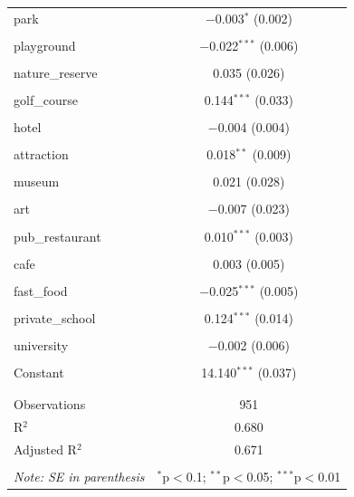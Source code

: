 \documentclass{article}
\begin{document}
\begin{table}[H]
\begin{tabular}{@{\extracolsep{-10pt}}lc}
 park & $-$0.003$^{*}$ (0.002) \\ 
  & \\ 
 playground & $-$0.022$^{***}$ (0.006) \\ 
  & \\ 
 nature\_reserve & 0.035 (0.026) \\ 
  & \\ 
 golf\_course & 0.144$^{***}$ (0.033) \\ 
  & \\ 
 hotel & $-$0.004 (0.004) \\ 
  & \\ 
 attraction & 0.018$^{**}$ (0.009) \\ 
  & \\ 
 museum & 0.021 (0.028) \\ 
  & \\ 
 art & $-$0.007 (0.023) \\ 
  & \\ 
 pub\_restaurant & 0.010$^{***}$ (0.003) \\ 
  & \\ 
 cafe & 0.003 (0.005) \\ 
  & \\ 
 fast\_food & $-$0.025$^{***}$ (0.005) \\ 
  & \\ 
 private\_school & 0.124$^{***}$ (0.014) \\ 
  & \\ 
 university & $-$0.002 (0.006) \\ 
  & \\ 
 Constant & 14.140$^{***}$ (0.037) \\ 
  & \\ 
\hline \\[-1.8ex] 
Observations & 951 \\ 
R$^{2}$ & 0.680 \\ 
Adjusted R$^{2}$ & 0.671 \\ 
\hline 
\hline \\[-1.8ex] 
\textit{Note: SE in parenthesis}  & \multicolumn{1}{r}{$^{*}$p$<$0.1; $^{**}$p$<$0.05; $^{***}$p$<$0.01} \\ 
\end{tabular} 
\end{table} 
\end{document}
